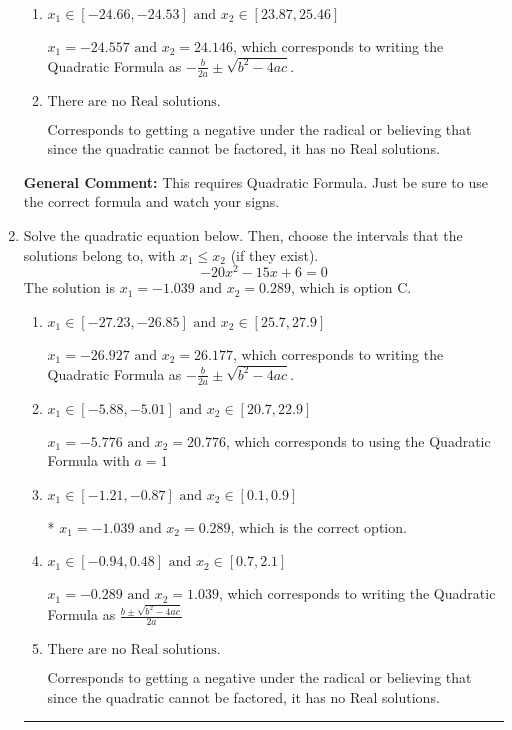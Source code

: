 \documentclass{extbook}[14pt]
\newcommand{\litem}[1]{\item #1

\rule{\textwidth}{0.4pt}}
\begin{document}
\begin{enumerate}
{\begin{enumerate}[label=\Alph*.]
 $x_1 = -0.510 \text{ and } x_2 = 0.922$, which corresponds to writing the Quadratic Formula as $\frac{b \pm \sqrt{b^2 - 4ac}}{2a}$
\item \( x_1 \in [-24.66, -24.53] \text{ and } x_2 \in [23.87, 25.46] \)

 $x_1 = -24.557 \text{ and } x_2 = 24.146$, which corresponds to writing the Quadratic Formula as $-\frac{b}{2a} \pm \sqrt{b^2 - 4ac}$.
\item \( \text{There are no Real solutions.} \)

Corresponds to getting a negative under the radical or believing that since the quadratic cannot be factored, it has no Real solutions.
\end{enumerate}

\textbf{General Comment:} This requires Quadratic Formula. Just be sure to use the correct formula and watch your signs.
}
\litem{
Solve the quadratic equation below. Then, choose the intervals that the solutions belong to, with $x_1 \leq x_2$ (if they exist).
\[ -20x^{2} -15 x + 6 = 0 \]The solution is \( x_1 = -1.039 \text{ and } x_2 = 0.289 \), which is option C.\begin{enumerate}[label=\Alph*.]
\item \( x_1 \in [-27.23, -26.85] \text{ and } x_2 \in [25.7, 27.9] \)

 $x_1 = -26.927 \text{ and } x_2 = 26.177$, which corresponds to writing the Quadratic Formula as $-\frac{b}{2a} \pm \sqrt{b^2 - 4ac}$.
\item \( x_1 \in [-5.88, -5.01] \text{ and } x_2 \in [20.7, 22.9] \)

 $x_1 = -5.776 \text{ and } x_2 = 20.776$, which corresponds to using the Quadratic Formula with $a=1$
\item \( x_1 \in [-1.21, -0.87] \text{ and } x_2 \in [0.1, 0.9] \)

* $x_1 = -1.039 \text{ and } x_2 = 0.289$, which is the correct option.
\item \( x_1 \in [-0.94, 0.48] \text{ and } x_2 \in [0.7, 2.1] \)

 $x_1 = -0.289 \text{ and } x_2 = 1.039$, which corresponds to writing the Quadratic Formula as $\frac{b \pm \sqrt{b^2 - 4ac}}{2a}$
\item \( \text{There are no Real solutions.} \)

Corresponds to getting a negative under the radical or believing that since the quadratic cannot be factored, it has no Real solutions.
\end{enumerate}

}
\end{enumerate}
\end{document}

